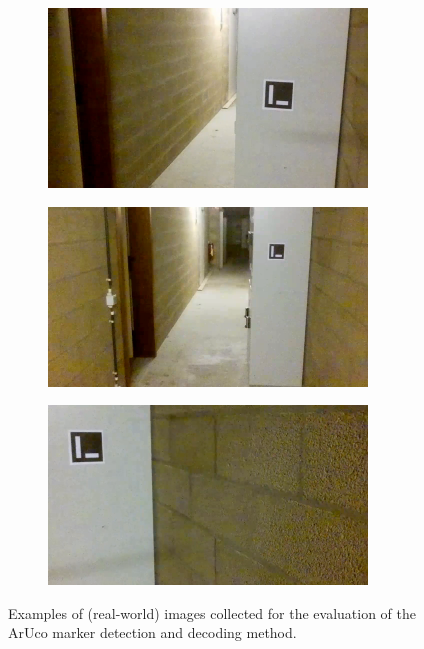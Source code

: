 \begin{figure}[H]
    \centering
    \begin{subfigure}{0.32\textwidth}
        \centering
        \includegraphics[width=\textwidth]{resources/png/07/markers/aruco/0.png}
    \end{subfigure}
    \hfill
    \begin{subfigure}{0.32\textwidth}
        \centering
        \includegraphics[width=\textwidth]{resources/png/07/markers/aruco/1.png}
    \end{subfigure}
    \hfill
    \begin{subfigure}{0.32\textwidth}
        \centering
        \includegraphics[width=\textwidth]{resources/png/07/markers/aruco/2.png}
    \end{subfigure}
    \caption{Examples of (real-world) images collected for the evaluation of the ArUco marker detection and decoding method.}
    \label{fig:07.markers.aruco.examples}
\end{figure}

